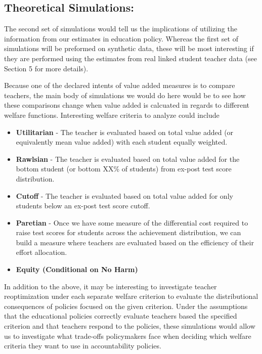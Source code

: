 \documentclass[letterpaper,12pt]{article}
\begin{document}


%


\subsection{Theoretical Simulations:}

The second set of simulations would tell us the implications of utilizing the information from our estimates in education policy. Whereas the first set of simulations will be preformed on synthetic data, these will be most interesting if they are performed using the estimates from real linked student teacher data (see Section 5 for more details).

Because one of the declared intents of value added measures is to compare teachers, the main body of simulations we would do here would be to see how these comparisons change when value added is calcuated in regards to different welfare functions. Interesting welfare criteria to analyze could include

\begin{itemize}
    \item \textbf{Utilitarian} - The teacher is evaluated based on total value added (or equivalently mean value added) with each student equally weighted.
    \item \textbf{Rawlsian} - The teacher is evaluated based on total value added for the bottom student (or bottom XX\% of students) from ex-post test score distribution. 
    \item \textbf{Cutoff} - The teacher is evaluated based on total value added for only students below an ex-post test score cutoff.
    \item \textbf{Paretian} - Once we have some measure of the differential cost required to raise test scores for students across the achievement distribution, we can build a measure where teachers are evaluated based on the efficiency of their effort allocation.
    \item \textbf{Equity (Conditional on No Harm)}
\end{itemize}

In addition to the above, it may be interesting to investigate teacher reoptimization under each separate welfare criterion to evaluate the distributional consequences of policies focused on the given criterion. Under the assumptions that the educational policies correctly evaluate teachers based the specified criterion and that teachers respond to the policies, these simulations would allow us to investigate what trade-offs policymakers face when deciding which welfare criteria they want to use in accountability policies.
\end{document}
